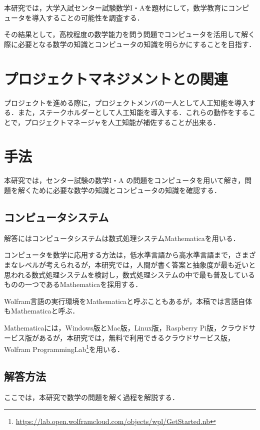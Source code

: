 本研究では，大学入試センター試験数学I・Aを題材にして，数学教育にコンピュータを導入することの可能性を調査する．

その結果として，高校程度の数学能力を問う問題でコンピュータを活用して解く際に必要となる数学の知識とコンピュータの知識を明らかにすることを目指す．

\chapter{プロジェクトマネジメントとの関連}

プロジェクトを進める際に，プロジェクトメンバの一人として人工知能を導入する．また，ステークホルダーとして人工知能を導入する．これらの動作をすることで，プロジェクトマネージャを人工知能が補佐することが出来る．

\chapter{手法}

本研究では，センター試験の数学I・A の問題をコンピュータを用いて解き，問題を解くために必要な数学の知識とコンピュータの知識を確認する．



\section{コンピュータシステム}

解答にはコンピュータシステムは数式処理システムMathematicaを用いる．

コンピュータを数学に応用する方法は，低水準言語から高水準言語まで，さまざまなレベルが考えられるが，本研究では，人間が書く答案と抽象度が最も近いと思われる数式処理システムを検討し，数式処理システムの中で最も普及しているものの一つであるMathematicaを採用する．

Wolfram言語の実行環境をMathematicaと呼ぶこともあるが，本稿では言語自体もMathematicaと呼ぶ．

Mathematicaには，Windows版とMac版，Linux版，Raspberry Pi版，クラウドサービス版があるが，本研究では，無料で利用できるクラウドサービス版，Wolfram ProgrammingLab\footnote{\url{https://lab.open.wolframcloud.com/objects/wpl/GetStarted.nb}}を用いる．

\clearpage

\section{解答方法}

ここでは，本研究で数学の問題を解く過程を解説する．

